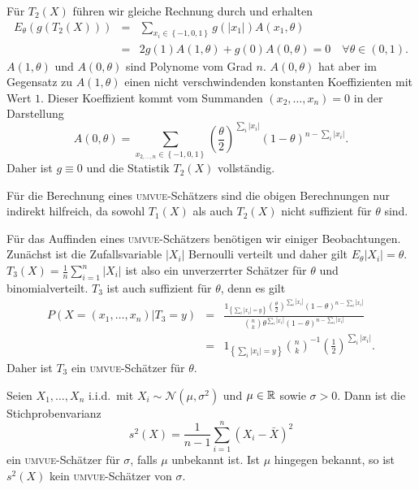 Für $T_2\left( X \right)$ führen wir gleiche Rechnung durch und erhalten
\begin{eqnarray}
	E_\theta(g\left( T_2\left( X \right) \right)) &=& \sum_{x_i\in\left\{ -1,0,1 \right\}}^{} g(|x_1|) A\left( x_1, \theta \right) \\
	&=& 2 g(1) A(1,\theta) + g(0) A(0,\theta) = 0 \quad \forall\theta\in (0,1).
\end{eqnarray}
$A(1,\theta)$ und $A(0,\theta)$ sind Polynome vom Grad $n$. $A(0,\theta)$ hat aber im Gegensatz zu $A(1,\theta)$ 
einen nicht verschwindenden konstanten Koeffizienten mit Wert $1$. Dieser Koeffizient kommt vom Summanden $(x_2,\ldots,x_n)=0$
in der Darstellung
\begin{equation}
	A(0, \theta) = \sum_{x_{2,\ldots,n}\in\left\{ -1,0,1 \right\}}^{}\left( \frac{\theta}{2} \right)^{\sum_{i}^{} |x_i|}\left( 1-\theta \right)^{n-\sum_{i}^{} |x_i|}.
\end{equation}
Daher ist $g\equiv 0$ und die Statistik $T_2(X)$ vollständig. 

Für die Berechnung eines \textsc{umvue}-Schätzers sind die obigen Berechnungen nur indirekt 
hilfreich, da sowohl $T_1(X)$ als auch $T_2(X)$ nicht suffizient für $\theta$ sind. 

Für das Auffinden eines \textsc{umvue}-Schätzers benötigen wir einiger Beobachtungen. 
Zunächst ist die Zufallsvariable $|X_i|$ Bernoulli verteilt und daher gilt $E_\theta |X_i|=\theta$.
$T_3(X)= \frac{1}{n} \sum_{i=1}^{n} |X_i|$ ist also ein unverzerrter Schätzer für $\theta$ und
binomialverteilt. 
$T_3$ ist auch suffizient für $\theta$, denn es gilt
\begin{eqnarray}
	P( X=\left( x_1,\ldots,x_n \right)| T_3=y) &=& \frac{ 1_{ \left\{ \sum_{i}^{} |x_i|=y \right\} } \left( \frac{\theta}{2} \right)^{\sum_{i}^{} |x_i|}  \left( 1-\theta \right)^{n-\sum_{i}^{} |x_i| }   }{ \binom{n}{k} \theta^{\sum_{i}^{} |x_i|   } (1-\theta)^{n-\sum_{i}^{} |x_i|}        } \\
	&=& 1_{ \left\{ \sum_{i}^{} |x_i|=y \right\} } \binom{n}{k}^{-1} \left( \frac{1}{2} \right)^{\sum_{i}^{} |x_i|}.
\end{eqnarray}
Daher ist $T_3$ ein \textsc{umvue}-Schätzer für $\theta$.





Seien $X_1,\ldots,X_n$ i.i.d.\ mit $X_i \sim \mathcal N(\mu,\sigma^2)$ und
$\mu\in\mathbb R$ sowie $\sigma>0$.  Dann ist die Stichprobenvarianz 
\begin{equation*}
	s^2(X) = \frac{1}{n-1} \sum_{i=1}^{n} (X_i - \bar X)^2
\end{equation*}
ein \textsc{umvue}-Schätzer für $\sigma$, falls $\mu$ unbekannt ist. 
Ist $\mu$ hingegen bekannt, so ist $s^2(X)$ kein \textsc{umvue}-Schätzer
von $\sigma$. 

